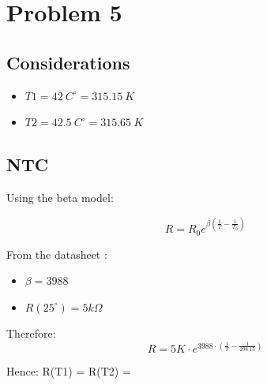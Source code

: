 \section{Problem 5}

\subsection{Considerations}

\begin{itemize}
        
    \item $T1 = 42~C^\circ   =  315.15 ~K$
    \item $T2 = 42.5~C^\circ =  315.65 ~K$

\end{itemize}
\subsection{NTC}

Using the beta model:

\begin{equation}
    R = R_0 e^{\beta\left ( \frac{1}{T} - \frac{1}{T_0 } \right )}
\end{equation}


From the datasheet :
\begin{itemize}
    \item $\beta = 3988$
    \item $R(25^{\circ}) = 5k\Omega$ 
\end{itemize}

Therefore: 
\begin{equation}
    R = 5K\cdot e^{ 3988\cdot \left ( \frac{1}{T} - \frac{1}{298.15 } \right )}
\end{equation}

Hence: 
R(T1) = 
R(T2) = 




